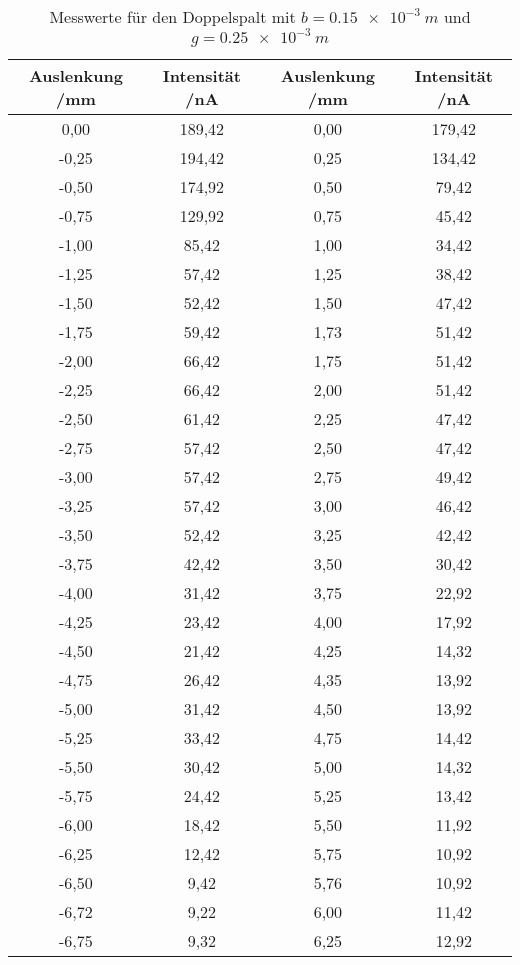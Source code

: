 \begin{table}[h!]
  \centering
  \caption{Messwerte für den Doppelspalt mit $b=\SI{0,15e-3}{m}$ und $g=\SI{0,25e-3}{m}$}
  \label{tab:2}
  \begin{tabular}{c c c c}
    \toprule
       Auslenkung /mm  & Intensität /nA & Auslenkung /mm  & Intensität /nA  \\
    \midrule



    0,00		& 189,42&0,00		& 179,42\\
   -0,25		& 194,42&0,25		& 134,42\\
   -0,50		& 174,92&0,50		& 79,42\\
   -0,75		& 129,92&0,75		& 45,42\\
   -1,00		& 85,42& 1,00		& 34,42\\
   -1,25		& 57,42& 1,25		& 38,42\\
   -1,50		& 52,42& 1,50		& 47,42\\
   -1,75		& 59,42& 1,73		& 51,42\\
   -2,00		& 66,42& 1,75		& 51,42\\
   -2,25		& 66,42& 2,00		& 51,42\\
   -2,50		& 61,42& 2,25		& 47,42\\
   -2,75		& 57,42& 2,50		& 47,42\\
   -3,00		& 57,42& 2,75		& 49,42\\
   -3,25		& 57,42& 3,00		& 46,42\\
   -3,50		& 52,42& 3,25		& 42,42\\
   -3,75		& 42,42& 3,50		& 30,42\\
   -4,00		& 31,42& 3,75		& 22,92\\
   -4,25		& 23,42& 4,00		& 17,92\\
   -4,50		& 21,42& 4,25		& 14,32\\
   -4,75		& 26,42& 4,35		& 13,92\\
   -5,00		& 31,42& 4,50		& 13,92\\
   -5,25		& 33,42& 4,75		& 14,42\\
   -5,50		& 30,42& 5,00		& 14,32\\
   -5,75		& 24,42& 5,25		& 13,42\\
   -6,00		& 18,42& 5,50		& 11,92\\
   -6,25		& 12,42& 5,75		& 10,92\\
   -6,50		& 9,42& 5,76		& 10,92\\
   -6,72		& 9,22& 6,00		& 11,42\\
   -6,75		& 9,32& 6,25		& 12,92\\

\end{tabular}
\end{table}
